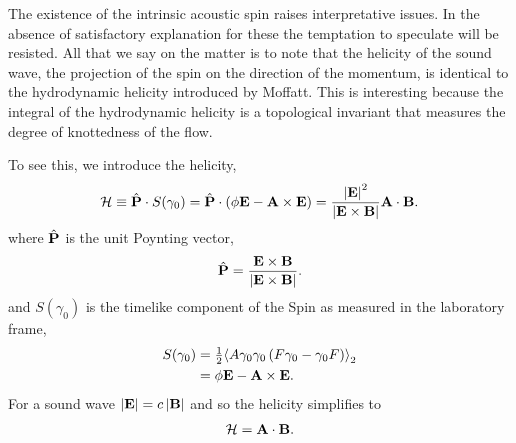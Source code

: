 
The existence of the intrinsic acoustic spin raises  interpretative issues.
In the absence of satisfactory explanation for these the temptation to speculate will be resisted.
All that we say on the matter is to note that the helicity of the sound wave, 
the projection of the spin on the direction of the momentum, 
is identical to the hydrodynamic helicity introduced by Moffatt\cite{Moffatt1969}.
This is interesting because the integral of the hydrodynamic helicity is a topological invariant that measures the degree of knottedness of the flow\cite{Moffatt1969}.

To see this, we introduce the helicity,
\begin{align}
  {\cal H} \equiv   \hat {\mathbf{P}} \cdot S(\gamma_0) = \hat {\mathbf{P}} \cdot \left( \phi \mathbf{E} - \textbf{A} \times\mathbf{E} \right) =  \frac{\left| \mathbf{E} \right|^2}{\left| \mathbf{E}\times\mathbf{B} \right|}\textbf{A} \cdot \mathbf{B}.
\end{align}
where  $\hat {\mathbf{P}}$ is the unit  Poynting vector, 
\begin{align}
 \hat{\mathbf{P}} =\frac{\mathbf{E} \times \mathbf{B}}{\left| \mathbf{E}\times\mathbf{B} \right|}.
\end{align}
and $S(\gamma_0)$ is the timelike component of the Spin 
as measured in the laboratory frame,
\begin{align}
 S(\gamma_0) %
 &= \half\bivector{A\g \g \lr{F\g - \g F}}\\
 &= \phi\vE - \vA \times \vE.
\end{align}
For a sound wave
$\left| \mathbf{E} \right| = c\left| \mathbf{B} \right|$
and so the helicity simplifies to
\begin{align}
  \label{eqn:Helicity}
{\cal H} = \textbf{A} \cdot \mathbf{B}.
\end{align}

